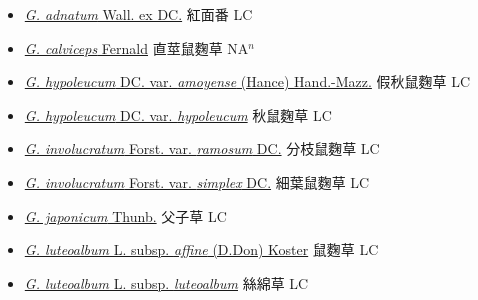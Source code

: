 \begin{itemize}
  \begin{itemize}
        \item[] \href{http://www.theplantlist.org/tpl1.1/search?q=Gnaphalium+adnatum}{\textit{G. adnatum} Wall. ex DC.}   紅面番 LC
        \item[] \href{http://www.theplantlist.org/tpl1.1/search?q=Gnaphalium+calviceps}{\textit{G. calviceps} Fernald}   直莖鼠麴草 NA$^n$
        \item[] \href{http://www.theplantlist.org/tpl1.1/search?q=Gnaphalium+hypoleucum+var.+amoyense}{\textit{G. hypoleucum} DC. var. \textit{amoyense} (Hance) Hand.-Mazz.}   假秋鼠麴草 LC
        \item[] \href{http://www.theplantlist.org/tpl1.1/search?q=Gnaphalium+hypoleucum+var.+hypoleucum}{\textit{G. hypoleucum} DC. var. \textit{hypoleucum}}   秋鼠麴草 LC
        \item[] \href{http://www.theplantlist.org/tpl1.1/search?q=Gnaphalium+involucratum+var.+ramosum}{\textit{G. involucratum} Forst. var. \textit{ramosum} DC.}   分枝鼠麴草 LC
        \item[] \href{http://www.theplantlist.org/tpl1.1/search?q=Gnaphalium+involucratum+var.+simplex}{\textit{G. involucratum} Forst. var. \textit{simplex} DC.}   細葉鼠麴草 LC
        \item[] \href{http://www.theplantlist.org/tpl1.1/search?q=Gnaphalium+japonicum}{\textit{G. japonicum} Thunb.}   父子草 LC
        \item[] \href{http://www.theplantlist.org/tpl1.1/search?q=Gnaphalium+luteoalbum+subsp.+affine}{\textit{G. luteoalbum} L. subsp. \textit{affine} (D.Don) Koster}   鼠麴草 LC
        \item[] \href{http://www.theplantlist.org/tpl1.1/search?q=Gnaphalium+luteoalbum+subsp.+luteoalbum}{\textit{G. luteoalbum} L. subsp. \textit{luteoalbum}}   絲綿草 LC

\end{itemize}
\end{itemize}
